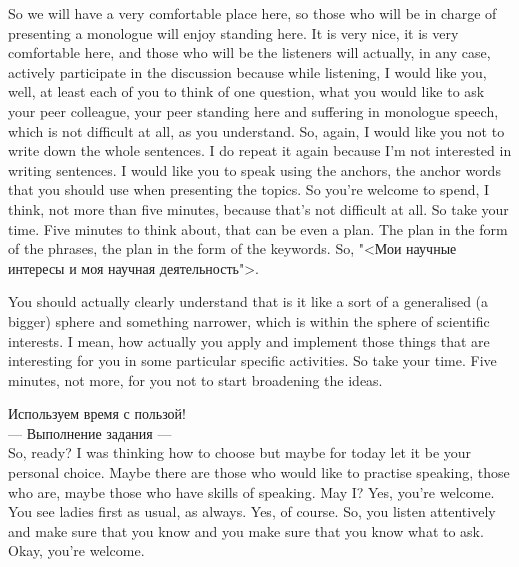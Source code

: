 \documentclass[main.tex]{subfiles}
\begin{document}
So we will have a very comfortable place here, so those who will be in charge of presenting a monologue will enjoy standing here.
It is very nice, it is very comfortable here, and those who will be the listeners will actually, in any case, actively participate in the discussion because while listening, I would like you, well, at least each of you to think of one question, what you would like to ask your peer colleague, your peer standing here and suffering in monologue speech, which is not difficult at all, as you understand.
So, again, I would like you not to write down the whole sentences.
I do repeat it again because I'm not interested in writing sentences.
I would like you to speak using the anchors, the anchor words that you should use when presenting the topics.
So you're welcome to spend, I think, not more than five minutes, because that's not difficult at all.
So take your time.
Five minutes to think about, that can be even a plan.
The plan in the form of the phrases, the plan in the form of the keywords.
So, "<Мои научные интересы и моя научная деятельность">.

You should actually clearly understand that is it like a sort of a generalised (a bigger) sphere and something narrower, which is within the sphere of scientific interests.
I mean, how actually you apply and implement those things that are interesting for you in some particular specific activities.
So take your time.
Five minutes, not more, for you not to start broadening the ideas.

Используем время с пользой!
\\

--- Выполнение задания ---
\\

So, ready?
I was thinking how to choose but maybe for today let it be your personal choice.
Maybe there are those who would like to practise speaking, those who are, maybe those who have skills of speaking.
May I?
Yes, you're welcome.
You see ladies first as usual, as always.
Yes, of course.
So, you listen attentively and make sure that you know and you make sure that you know what to ask.
Okay, you're welcome.

\end{document}
